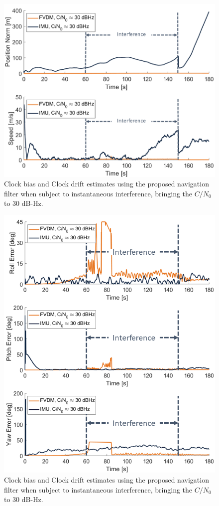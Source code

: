 \documentclass[12pt]{report}
\begin{document}
\begin{figure}[!ht]
  \centering
  \includegraphics[width=0.75\linewidth]{Figures/Results/trajectoryfigure/Slide17.PNG}
  \caption{Clock bias and Clock drift estimates using the proposed navigation filter when subject to instantaneous interference, bringing the \(C/N_0\) to \(30\) dB-Hz.}\label{fig:PosVel30}
\end{figure}


\begin{figure}[!ht]
  \centering
  \includegraphics[width=0.75\linewidth]{Figures/Results/trajectoryfigure/Slide5.PNG}
  \caption{Clock bias and Clock drift estimates using the proposed navigation filter when subject to instantaneous interference, bringing the \(C/N_0\) to \(30\) dB-Hz.}\label{fig:Eul30}
\end{figure}
\end{document}
